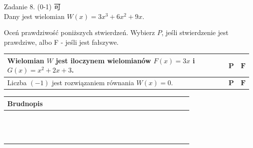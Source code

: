 \documentclass[10pt]{article}
\begin{document}
Zadanie 8. (0-1) 可\\
Dany jest wielomian \(W(x)=3 x^{3}+6 x^{2}+9 x\).

Oceń prawdziwość poniższych stwierdzeń. Wybierz \(P\), jeśli stwierdzenie jest prawdziwe, albo F - jeśli jest fałszywe.

\begin{center}
\begin{tabular}{|l|l|c|}
\hline
Wielomian \(W\) jest iloczynem wielomianów \(F(x)=3 x\) i \(G(x)=x^{2}+2 x+3\). & \(\mathbf{P}\) & \(\mathbf{F}\) \\
\hline
Liczba \((-1)\) jest rozwiązaniem równania \(W(x)=0\). & \(\mathbf{P}\) & \(\mathbf{F}\) \\
\hline
\end{tabular}
\end{center}

\begin{center}
\begin{tabular}{|c|c|c|c|c|c|c|c|c|c|c|c|c|c|c|c|c|c|c|c|c|c|c|c|c|c|}
\hline
\multicolumn{5}{|l|}{Brudnopis} &  &  &  &  &  &  &  &  &  &  &  &  &  &  &  &  &  &  &  &  &  \\
\hline
 &  &  &  &  &  &  &  &  &  &  &  &  &  &  &  &  &  &  &  &  &  &  &  &  &  \\
\hline
 &  &  &  &  &  &  &  &  &  &  &  &  &  &  &  &  &  &  &  &  &  &  &  &  &  \\
\hline
 &  &  &  &  &  &  &  &  &  &  &  &  &  &  &  &  &  &  &  &  &  &  &  &  &  \\
\hline
 &  &  &  &  &  &  &  &  &  &  &  &  &  &  &  &  &  &  &  &  &  &  &  &  &  \\
\hline
 &  &  &  &  &  &  &  &  &  &  &  &  &  &  &  &  &  &  &  &  &  &  &  &  &  \\
\hline
 &  &  &  &  &  &  &  &  &  &  &  &  &  &  &  &  &  &  &  &  &  &  &  &  &  \\
\hline
 &  &  &  &  &  &  &  &  &  &  &  &  &  &  &  &  &  &  &  &  &  &  &  &  &  \\
\hline
 &  &  &  &  &  &  &  &  &  &  &  &  &  &  &  &  &  &  &  &  &  &  &  &  &  \\
\hline
 &  &  &  &  &  &  &  &  &  &  &  &  &  &  &  &  &  &  &  &  &  &  &  &  &  \\
\hline
 &  &  &  &  &  &  &  &  &  &  &  &  &  &  &  &  &  &  &  &  &  &  &  &  &  \\
\hline
 &  &  &  &  &  &  &  &  &  &  &  &  &  &  &  &  &  &  &  &  &  &  &  &  &  \\
\hline
 &  &  &  &  &  &  &  &  &  &  &  &  &  &  &  &  &  &  &  &  &  &  &  &  &  \\
\hline
 &  &  &  &  &  &  &  &  &  &  &  &  &  &  &  &  &  &  &  &  &  &  &  &  &  \\
\hline
\end{tabular}
\end{center}
\end{document}

